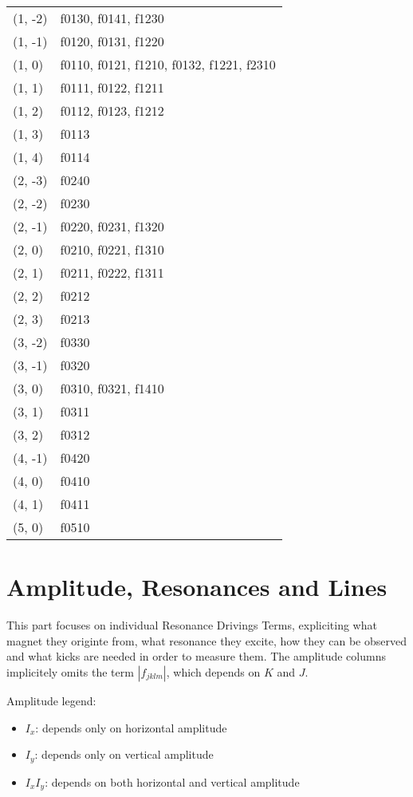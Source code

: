 \begin{longtable}[]{@{}ll@{}}
(1, -2) & f0130, f0141, f1230 \\
(1, -1) & f0120, f0131, f1220 \\
(1, 0) & f0110, f0121, f1210, f0132, f1221, f2310 \\
(1, 1) & f0111, f0122, f1211 \\
(1, 2) & f0112, f0123, f1212 \\
(1, 3) & f0113 \\
(1, 4) & f0114 \\
(2, -3) & f0240 \\
(2, -2) & f0230 \\
(2, -1) & f0220, f0231, f1320 \\
(2, 0) & f0210, f0221, f1310 \\
(2, 1) & f0211, f0222, f1311 \\
(2, 2) & f0212 \\
(2, 3) & f0213 \\
(3, -2) & f0330 \\
(3, -1) & f0320 \\
(3, 0) & f0310, f0321, f1410 \\
(3, 1) & f0311 \\
(3, 2) & f0312 \\
(4, -1) & f0420 \\
(4, 0) & f0410 \\
(4, 1) & f0411 \\
(5, 0) & f0510 \\
\bottomrule()
\end{longtable}

\newpage

\section{Amplitude, Resonances and Lines}

This part focuses on individual Resonance Drivings Terms, expliciting what magnet they originte from, what resonance they excite, how they can be observed and what kicks are needed in order to measure them.
The amplitude columns implicitely omits the term $|f_{jklm}|$, which depends on $K$ and $J$.

Amplitude legend:

\begin{itemize}
\tightlist
\item
  \colorbox{orange!20}{$I_x$}: depends only on horizontal amplitude
\item
  \colorbox{red!20}{$I_y$}: depends only on vertical amplitude
\item
  \colorbox{blue!20}{$I_x I_y$}: depends on both horizontal and vertical
  amplitude
\end{itemize}

